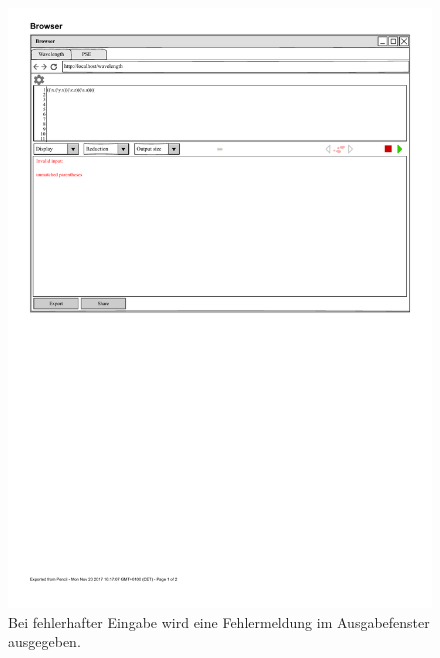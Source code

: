 \documentclass[parskip=full,11pt,twoside]{scrartcl}
\begin{document}
\begin{figure}[H]
	\centering
	\includegraphics[width=\textwidth]{img/fehlerausgabe}
	\caption{Bei fehlerhafter Eingabe wird eine Fehlermeldung im Ausgabefenster ausgegeben.
}
\end{figure}
\end{document}
